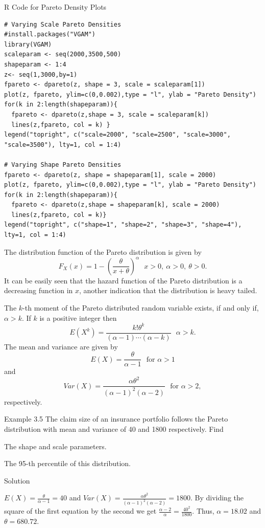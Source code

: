 \documentclass[]{book}
\theoremstyle{definition}
\theoremstyle{definition}
\theoremstyle{definition}
\theoremstyle{remark}
\begin{document}
R Code for Pareto Density Plots

\hypertarget{display.Paretoscale.2}{}
\begin{verbatim}
# Varying Scale Pareto Densities
#install.packages("VGAM")
library(VGAM)
scaleparam <- seq(2000,3500,500)
shapeparam <- 1:4
z<- seq(1,3000,by=1)
fpareto <- dpareto(z, shape = 3, scale = scaleparam[1])
plot(z, fpareto, ylim=c(0,0.002),type = "l", ylab = "Pareto Density")
for(k in 2:length(shapeparam)){
  fpareto <- dpareto(z,shape = 3, scale = scaleparam[k])
  lines(z,fpareto, col = k) }
legend("topright", c("scale=2000", "scale=2500", "scale=3000", "scale=3500"), lty=1, col = 1:4)

# Varying Shape Pareto Densities
fpareto <- dpareto(z, shape = shapeparam[1], scale = 2000)
plot(z, fpareto, ylim=c(0,0.002),type = "l", ylab = "Pareto Density")
for(k in 2:length(shapeparam)){
  fpareto <- dpareto(z,shape = shapeparam[k], scale = 2000)
  lines(z,fpareto, col = k)}
legend("topright", c("shape=1", "shape=2", "shape=3", "shape=4"), lty=1, col = 1:4)
\end{verbatim}

The distribution function of the Pareto distribution is given by
\[F_{X}\left( x \right) = 1 - \left( \frac{\theta}{x + \theta} \right)^{\alpha}  \ \ \ x > 0,\ \alpha > 0,\ \theta > 0.\]
It can be easily seen that the hazard function of the Pareto
distribution is a decreasing function in \(x\), another indication that
the distribution is heavy tailed.

The \(k\)-th moment of the Pareto distributed random variable exists, if
and only if, \(\alpha > k\). If \(k\) is a positive integer then
\[E\left( X^{k} \right) = \frac{k!\theta^{k}}{\left( \alpha - 1 \right)\cdots\left( \alpha - k \right)} \ \ \ \alpha > k.\]
The mean and variance are given by
\[E\left( X \right) = \frac{\theta}{\alpha - 1} \ \ \ \text{for } \alpha > 1\]
and
\[Var\left( X \right) = \frac{\alpha\theta^{2}}{\left( \alpha - 1 \right)^{2}\left( \alpha - 2 \right)} \ \ \ \text{for } \alpha > 2,\]respectively.

Example 3.5 The claim size of an insurance portfolio follows the Pareto
distribution with mean and variance of 40 and 1800 respectively. Find

The shape and scale parameters.

The 95-th percentile of this distribution.

Solution

\(E\left( X \right) = \frac{\theta}{\alpha - 1} = 40\) and
\(Var\left( X \right) = \frac{\alpha\theta^{2}}{\left( \alpha - 1 \right)^{2}\left( \alpha - 2 \right)} = 1800\).
By dividing the square of the first equation by the second we get
\(\frac{\alpha - 2}{\alpha} = \frac{40^{2}}{1800}\). Thus,
\(\alpha = 18.02\) and \(\theta = 680.72\).
\end{document}
